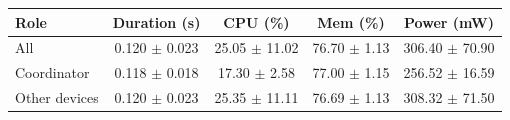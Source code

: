 \begin{tabular}{lcccc}
\hline
\textbf{Role} & \textbf{Duration (s)} & \textbf{CPU (\%)} & \textbf{Mem (\%)} & \textbf{Power (mW)} \\
\hline
All & 0.120 $\pm$ 0.023 & 25.05 $\pm$ 11.02 & 76.70 $\pm$ 1.13 & 306.40 $\pm$ 70.90 \\
Coordinator & 0.118 $\pm$ 0.018 & 17.30 $\pm$ 2.58 & 77.00 $\pm$ 1.15 & 256.52 $\pm$ 16.59 \\
Other devices & 0.120 $\pm$ 0.023 & 25.35 $\pm$ 11.11 & 76.69 $\pm$ 1.13 & 308.32 $\pm$ 71.50 \\
\hline
\end{tabular}
